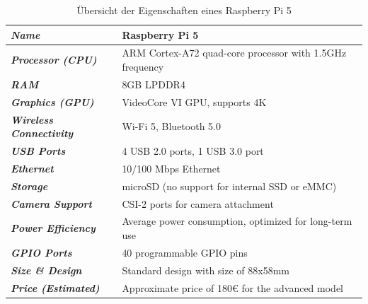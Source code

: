 \begin{table}[H]
    \centering
    \begin{tabular}{|l|l|}
    \hline
    \textit{\textbf{Name}}                                & \textbf{Raspberry Pi 5}                                  \\ \hline
    \textit{\textbf{Processor (CPU)}}                            & ARM Cortex-A72 quad-core processor with 1.5GHz frequency \\ \hline
    \textit{\textbf{RAM}}
    & 8GB LPDDR4                                               \\ \hline
    \textit{\textbf{Graphics (GPU)}}                             & VideoCore VI GPU, supports 4K                            \\ \hline
    \textit{\textbf{Wireless Connectivity}} & Wi-Fi 5, Bluetooth 5.0                                   \\ \hline
    \textit{\textbf{USB Ports}}                                  & 4 USB 2.0 ports, 1 USB 3.0 port                          \\ \hline
   \textit{\textbf{Ethernet}}                                   & 10/100 Mbps Ethernet                                     \\ \hline
    \textit{\textbf{Storage}}                                    & microSD (no support for internal SSD or eMMC)            \\ \hline
    \textit{\textbf{Camera Support}}                             & CSI-2 ports for camera attachment                         \\ \hline
    \textit{\textbf{Power Efficiency}}                           & Average power consumption, optimized for long-term use   \\ \hline
    \textit{\textbf{GPIO Ports}}                                 & 40 programmable GPIO pins                                \\ \hline
    \textit{\textbf{Size \& Design}}                             & Standard design with size of 88x58mm                     \\ \hline
    \textit{\textbf{Price (Estimated)}}                          & Approximate price of 180€ for the advanced model             \\ 
    \hline

    \end{tabular}
    \caption{Übersicht der Eigenschaften eines Raspberry Pi 5}
    \label{tab:Eigenschaftstabelle}
\end{table}

